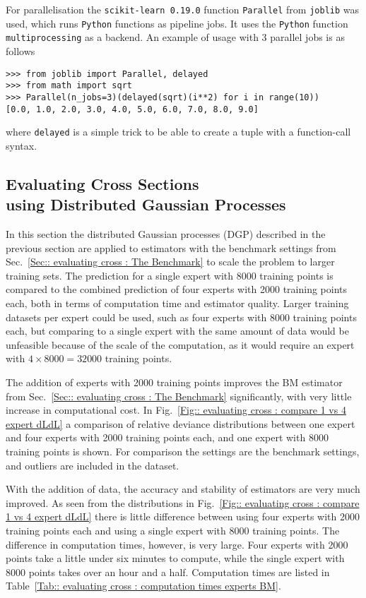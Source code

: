 \documentclass[twoside,english]{uiofysmaster}
\begin{document}
{{For parallelisation the \verb|scikit-learn 0.19.0| function \verb|Parallel| from \verb|joblib| was used, which runs \verb|Python| functions as pipeline jobs. It uses the \verb|Python| function \verb|multiprocessing| as a backend. An example of usage with 3 parallel jobs is as follows
\begin{lstlisting}
>>> from joblib import Parallel, delayed
>>> from math import sqrt
>>> Parallel(n_jobs=3)(delayed(sqrt)(i**2) for i in range(10))
[0.0, 1.0, 2.0, 3.0, 4.0, 5.0, 6.0, 7.0, 8.0, 9.0]
\end{lstlisting}
where \verb|delayed| is a simple trick to be able to create a tuple with a function-call syntax.

\subsection{Evaluating Cross Sections\\ using Distributed Gaussian Processes}

In this section the distributed Gaussian processes (DGP) described in the previous section are applied to estimators with the benchmark settings from Sec.~\ref{Sec:: evaluating cross : The Benchmark} to scale the problem to larger training sets. The prediction for a single expert with 8000 training points is compared to the combined prediction of four experts with 2000 training points each, both in terms of computation time and estimator quality. Larger training datasets per expert could be used, such as four experts with 8000 training points each, but comparing to a single expert with the same amount of data would be unfeasible because of the scale of the computation, as it would require an expert with $4 \times 8000 = 32 000$ training points.


The addition of experts with 2000 training points improves the BM estimator from Sec.~\ref{Sec:: evaluating cross : The Benchmark} significantly, with very little increase in computational cost. In Fig.~\ref{Fig:: evaluating cross : compare 1 vs 4 expert dLdL} a comparison of relative deviance distributions between one expert and four experts with 2000 training points each, and one expert with 8000 training points is shown.  For comparison the settings are the benchmark settings, and outliers are included in the dataset. 

With the addition of data, the accuracy and stability of estimators are very much improved. As seen from the distributions in Fig.~\ref{Fig:: evaluating cross : compare 1 vs 4 expert dLdL} there is little difference between using four experts with 2000 training points each and using a single expert with 8000 training points. The difference in computation times, however, is very large. Four experts with 2000 points take a little under six minutes to compute, while the single expert with 8000 points takes over an hour and a half. Computation times are listed in Table~\ref{Tab:: evaluating cross : computation times experts BM}.

}}
\end{document}
